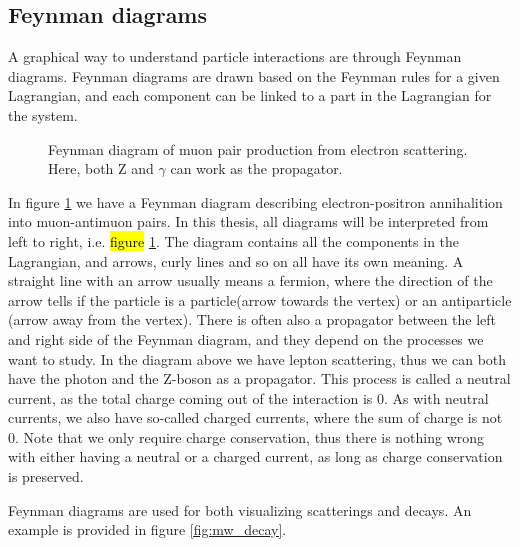 \subsection*{Feynman diagrams}
A graphical way to understand particle interactions are through Feynman diagrams. Feynman diagrams 
are drawn based on the Feynman rules for a given Lagrangian\cite{Pich:819632}\cite{feynrules}, 
and each component can be linked to a part in the Lagrangian for the system. 

\begin{figure}[H]
    \centering
    
    \caption[Electron scattering diagram]{Feynman diagram of muon pair production from electron scattering. Here, both Z and $\gamma$ can work as the propagator.}
    \label{fig:eemm_scat}
\end{figure}

In figure \ref{fig:eemm_scat} we have a Feynman diagram describing electron-positron annihalition into muon-antimuon pairs. In this thesis, all 
diagrams will be interpreted from left to right, i.e. \hl{figure} \ref{fig:eemm_scat}.
The diagram contains all the components in the Lagrangian, and arrows, curly lines and so on all have its own meaning. A straight line with 
an arrow usually means a fermion, where the direction of the arrow tells if the particle is a particle(arrow towards the vertex) or an antiparticle (arrow away from the vertex). 
There is often also a propagator between the left and right side of the Feynman diagram, 
and they depend on the processes we want to study. In the diagram above we have lepton scattering, thus we can both have the photon and the 
Z-boson as a propagator. This process is called a neutral current\cite{Pich:819632}, as the total charge coming out of the interaction is 0. 
As with neutral currents, we also have so-called charged currents, where the sum of charge is not 0. Note that we only require charge conservation,
thus there is nothing wrong with either having a neutral or a charged current, as long as charge conservation is preserved. \par 
Feynman diagrams are used for both visualizing scatterings and decays. An example is provided in figure \ref{fig:mw_decay}. 

